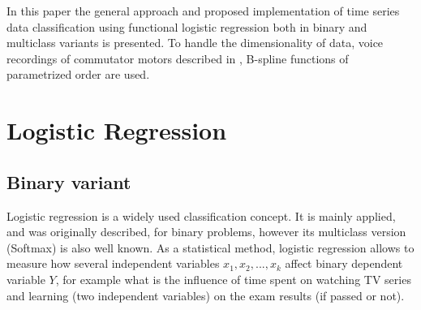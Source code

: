 \documentclass[energies,article,submit,pdftex,moreauthors]{Definitions/mdpi}
\begin{document}
In this paper the general approach and proposed implementation of time series data classification using functional logistic regression both in binary and multiclass variants is presented. To handle the dimensionality of data, voice recordings of commutator motors described in \cite{ref-motors}, B-spline functions of parametrized order are used.

\section{Logistic Regression}
\subsection{Binary variant}
Logistic regression is a widely used classification concept. It is mainly applied, and was originally described, for binary problems, however its multiclass version (Softmax) is also well known. As a statistical method, logistic regression allows to measure how several independent variables $ x_1, x_2, ...,  x_k $ affect binary dependent variable $Y$, for example what is the influence of time spent on watching TV series and learning (two independent variables) on the exam results (if passed or not). 
\end{document}
